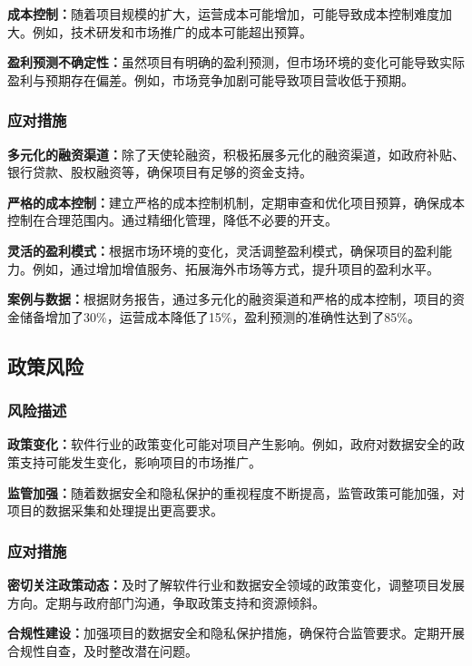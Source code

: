 \documentclass[12pt,a4paper]{article}
\begin{document}
\textbf{成本控制：}随着项目规模的扩大，运营成本可能增加，可能导致成本控制难度加大。例如，技术研发和市场推广的成本可能超出预算。

\textbf{盈利预测不确定性：}虽然项目有明确的盈利预测，但市场环境的变化可能导致实际盈利与预期存在偏差。例如，市场竞争加剧可能导致项目营收低于预期。

\subsubsection{应对措施}
\textbf{多元化的融资渠道：}除了天使轮融资，积极拓展多元化的融资渠道，如政府补贴、银行贷款、股权融资等，确保项目有足够的资金支持。

\textbf{严格的成本控制：}建立严格的成本控制机制，定期审查和优化项目预算，确保成本控制在合理范围内。通过精细化管理，降低不必要的开支。

\textbf{灵活的盈利模式：}根据市场环境的变化，灵活调整盈利模式，确保项目的盈利能力。例如，通过增加增值服务、拓展海外市场等方式，提升项目的盈利水平。

\textbf{案例与数据：}根据财务报告，通过多元化的融资渠道和严格的成本控制，项目的资金储备增加了30\%，运营成本降低了15\%，盈利预测的准确性达到了85\%。


\subsection{政策风险}

\subsubsection{风险描述}
\textbf{政策变化：}软件行业的政策变化可能对项目产生影响。例如，政府对数据安全的政策支持可能发生变化，影响项目的市场推广。

\textbf{监管加强：}随着数据安全和隐私保护的重视程度不断提高，监管政策可能加强，对项目的数据采集和处理提出更高要求。

\subsubsection{应对措施}
\textbf{密切关注政策动态：}及时了解软件行业和数据安全领域的政策变化，调整项目发展方向。定期与政府部门沟通，争取政策支持和资源倾斜。

\textbf{合规性建设：}加强项目的数据安全和隐私保护措施，确保符合监管要求。定期开展合规性自查，及时整改潜在问题。
\end{document}
